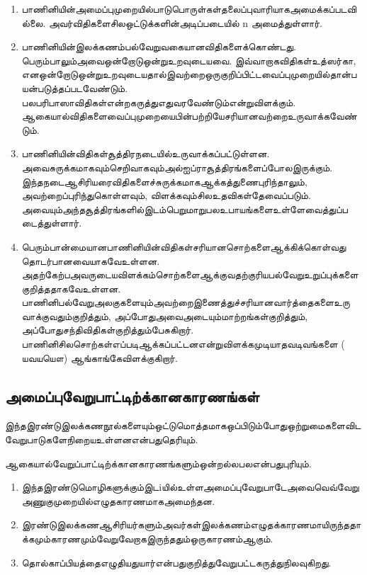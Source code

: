 \begin{enumerate}
\item பாணினியின்அமைப்புமுறையில்பாடுபொருள்கள்தலைப்புவாரியாகஅமைக்கப்படவில்லை. அவர்விதிகளைசிலஒட்டுக்களின்அடிப்படையில் n அமைத்துள்ளார்.

 \item பாணினியின்இலக்கணம்பல்வேறுவகையானவிதிகளைக்கொண்டது. பெரும்பாலும்அவைஒன்றோடுஒன்றுஉறவுடையவை. இவ்வாறாகவிதிகள்உத்ஸர்கா,  எனஒன்றோடுஒன்றுஉறவுடையதால்இவற்றைஒருகுறிப்பிட்டவைப்புமுறையில்தான்பயன்படுத்தப்படவேண்டும். பலபரிபாஸாவிதிகள்என்றகருத்துஎதுவரவேண்டும்என்றுவிளக்கும். ஆகையால்விதிகளைவைப்புமுறையைபின்பற்றியேசரியானவற்றைஉருவாக்கவேண்டும்.

 \item பாணினியின்விதிகள்சூத்திரநடையில்உருவாக்கப்பட்டுள்ளன. அவைசுருக்கமாகவும்செறிவாகவும்அல்ஐப்ராசூத்திரங்களைப்போலஇருக்கும். இந்தநடைஆசிரியரைவிதிகளைச்சுருக்கமாகஆக்கத்துணைபுரிந்தாலும், அவற்றைப்புரிந்துகொள்ளவும், விளக்கவும்சிலஉதவிகள்தேவைப்படும். அவையும்அந்தசூத்திரங்களில்இடம்பெறுமாறுபலஉபாயங்களைஉள்ளேவைத்துப்படைத்துள்ளார்.

 \item பெரும்பான்மையானபாணினியின்விதிகள்சரியானசொற்களைஆக்கிக்கொள்வதுதொடர்பானவையாகவேஉள்ளன. அதற்கேற்பஅவருடையவிளக்கம்சொற்களைஆக்குவதற்குரியபல்வேறுஉறுப்புக்களைகுறித்ததாகவேஉள்ளன. பாணினிபல்வேறுஅலகுகளையும்அவற்றைஇணைத்துச்சரியானவார்த்தைகளைஉருவாக்குவதும்குறித்தும், அப்போதுஅவைஅடையும்மாற்றங்கள்குறித்தும், அப்போதுசந்திவிதிகள்குறித்தும்பேசுகிறார். பாணினிசிலசொற்கள்எப்படிஆக்கப்பட்டனஎன்றுவிளக்கமுடியாதவடிவங்களை ( யவயயௌ) ஆங்காங்கேவிளக்குகிறார்.

\end{enumerate}


\subsection{அமைப்புவேறுபாட்டிற்க்கானகாரணங்கள்}

இந்தஇரண்டுஇலக்கணநூல்களையும்ஒட்டுமொத்தமாகஒப்பிடும்போதுஒற்றுமைகளைவிடவேறுபாடுகளேநிறையஉள்ளனஎன்பதுதெரியும். 

ஆகையால்வேறுப்பாட்டிற்க்கானகாரணங்களும்ஒன்றல்லபலஎன்பதுபுரியும்.

\begin{enumerate}
\item இந்தஇரண்டுமொழிகளுக்கும்இடiயில்உள்ளஅமைப்புவேறுபாடேஅவைவெவ்வேறுஅணுகுமுறையில்எழுதகாரணமாகஅமைந்தன.

 \item இரண்டுஇலக்கணஆசிரியர்களும்அவர்கள்இலக்கணம்எழுதக்காரணமாயிருந்ததாக்கமும்காரணமும்வேறுவேறாகஇருந்ததும்ஒருகாரணம்ஆகும்.

 \item தொல்காப்பியத்தைஎழுதியதுயார்என்பதுகுறித்துவேறுபட்டகருத்துநிலவுகிறது.

\end{enumerate}

